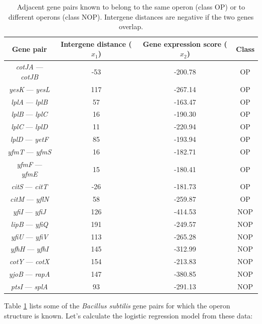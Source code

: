 \documentclass{report}
\begin{document}
\begin{table}[h]
\begin{center}
\caption{Adjacent gene pairs known to belong to the same operon (class OP) or to different operons (class NOP). Intergene distances are negative if the two genes overlap.}
\begin{tabular}{|c|c|c|c|}
\hline
Gene pair & Intergene distance ($x_1$) & Gene expression score ($x_2$) & Class\\
\hline
{\it cotJA} --- {\it cotJB} & -53 & -200.78 & OP\\
{\it yesK} --- {\it yesL} & 117 & -267.14 & OP\\
{\it lplA} --- {\it lplB} & 57 & -163.47 & OP\\
{\it lplB} --- {\it lplC} & 16 & -190.30 & OP\\
{\it lplC} --- {\it lplD} & 11 & -220.94 & OP\\
{\it lplD} --- {\it yetF} & 85 & -193.94 & OP\\
{\it yfmT} --- {\it yfmS} & 16 & -182.71 & OP\\
{\it yfmF} --- {\it yfmE} & 15 & -180.41 & OP\\
{\it citS} --- {\it citT} & -26 & -181.73 & OP\\
{\it citM} --- {\it yflN} & 58 & -259.87 & OP\\
{\it yfiI} --- {\it yfiJ} & 126 & -414.53 & NOP\\
{\it lipB} --- {\it yfiQ} & 191 & -249.57 & NOP\\
{\it yfiU} --- {\it yfiV} & 113 & -265.28 & NOP\\
{\it yfhH} --- {\it yfhI} & 145 & -312.99 & NOP\\
{\it cotY} --- {\it cotX} & 154 & -213.83 & NOP\\
{\it yjoB} --- {\it rapA} & 147 & -380.85 & NOP\\
{\it ptsI} --- {\it splA} & 93 & -291.13 & NOP \\
\hline
\end{tabular}
\label{table:training}
\end{center}
\end{table}

Table \ref{table:training} lists some of the {\it Bacillus subtilis} gene pairs for which the operon structure is known.
Let's calculate the logistic regression model from these data:
\end{document}
